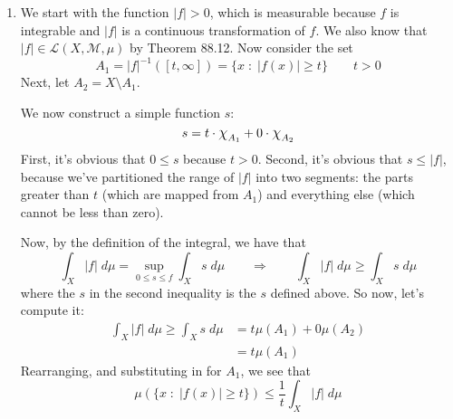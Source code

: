 \documentclass[12pt]{article}
\theoremstyle{plain}
\theoremstyle{definition}
\theoremstyle{remark}
\newcommand*{\Chi}{\mbox{\large$\chi$}} %
\begin{document}
\begin{enumerate}
\begin{enumerate}
\end{enumerate}



\newpage
\item We start with the function $|f|>0$, which is measurable because $f$ is integrable and $|f|$ is a continuous transformation of $f$. We also know that $|f|\in\mathscr{L}(X,\mathscr{M},\mu)$ by Theorem 88.12. Now consider the set
\[
    A_1 = |f|^{-1}([t,\infty]) = \{x \;:\; |f(x)|\geq t\}
    \qquad t>0
\]
Next, let $A_2 = X\setminus A_1$. 

We now construct a simple function $s$:
\[
    s = t\cdot \Chi_{A_1} + 0 \cdot \Chi_{A_2}
\]
First, it's obvious that $0\leq s$ because $t>0$. Second, it's obvious that $s\leq |f|$, because we've partitioned the range of $|f|$ into two segments: the parts greater than $t$ (which are mapped from $A_1$) and everything else (which cannot be less than zero).

Now, by the definition of the integral, we have that 
\[
    \int_X |f| \; d\mu = \sup_{0\leq s \leq f} \int_X s\;d\mu
    \qquad\Rightarrow\qquad
    \int_X |f| \; d\mu \geq \int_X s\;d\mu
\]
where the $s$ in the second inequality is the $s$ defined above. So now, let's compute it:
\begin{align*}
    \int_X |f| \; d\mu \geq \int_X s\;d\mu
    &= t \mu(A_1) + 0 \mu(A_2) \\
    &= t \mu(A_1) 
\end{align*}
Rearranging, and substituting in for $A_1$, we see that
\begin{equation}
    \mu\left(\{x \;:\; |f(x)|\geq t\}\right) \leq
    \frac{1}{t}\int_X |f| \; d\mu 
\end{equation}




\end{enumerate}
\end{document}
